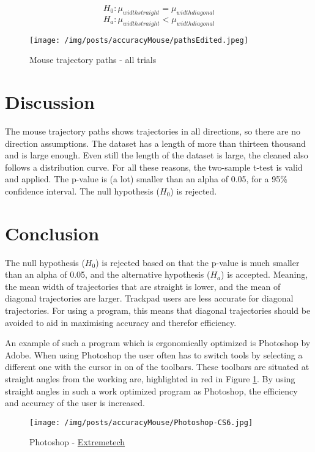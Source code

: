   $$H_0: \mu_{width straight} = \mu_{width diagonal}$$
  $$H_a: \mu_{width straight} < \mu_{width diagonal}$$

\begin{figure}
	\texttt{[image: /img/posts/accuracyMouse/pathsEdited.jpeg]}
	\caption{Mouse trajectory paths - all trials}
\end{figure}




\section*{Discussion}
The mouse trajectory paths shows trajectories in all directions, so there are no direction assumptions. The dataset has a length of more than thirteen thousand and is large enough. Even still the length of the dataset is large, the cleaned also follows a distribution curve. For all these reasons, the two-sample t-test is valid and applied. The p-value is (a lot) smaller than an alpha of 0.05, for a 95\% confidence interval. The null hypothesis ($𝐻_0$) is rejected.

\section*{Conclusion}
The null hypothesis ($𝐻_0$) is rejected based on that the p-value is much smaller than an alpha of 0.05, and the alternative hypothesis ($𝐻_𝑎$) is accepted. Meaning, the mean width of trajectories that are straight is lower, and the mean of diagonal trajectories are larger. Trackpad users are less accurate for diagonal trajectories. For using a program, this means that diagonal trajectories should be avoided to aid in maximising accuracy and therefor efficiency.

An example of such a program which is ergonomically optimized is Photoshop by Adobe. When using Photoshop the user often has to switch tools by selecting a different one with the cursor in on of the toolbars. These toolbars are situated at straight angles from the working are, highlighted in red in Figure \ref{fig:CS6}. By using straight angles in such a work optimized program as Photoshop, the efficiency and accuracy of the user is increased.

\begin{figure}
    \texttt{[image: /img/posts/accuracyMouse/Photoshop-CS6.jpg]}
    \caption{Photoshop - \href{https://www.extremetech.com/extreme/123179-photoshop-cs6-plenty-of-goodies-for-everyone}{Extremetech}}
    \label{fig:CS6}
\end{figure}